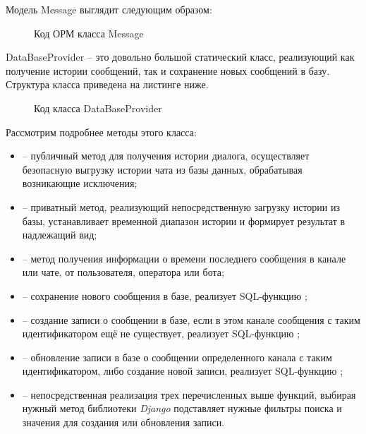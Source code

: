     \newpage
    Модель Message выглядит следующим образом:

    \begin{figure}[!h]
        \centering
        
        \caption{Код ОРМ класса Message}
        \label{fig:message_model}
    \end{figure}

    DataBaseProvider -- это довольно большой статический класс, реализующий как получение истории сообщений,
    так и сохранение новых сообщений в базу.
    Структура класса приведена на листинге ниже.

    \begin{figure}[!h]
        \centering
        
        \caption{Код класса DataBaseProvider}
        \label{fig:DataBaseProvider}
    \end{figure}

    Рассмотрим подробнее методы этого класса:
    \begin{itemize}
        \item {} -- публичный метод для получения истории диалога, осуществляет
        безопасную выгрузку истории чата из базы данных, обрабатывая возникающие исключения;
        \item {} -- приватный метод, реализующий непосредственную загрузку истории из базы,
        устанавливает временной диапазон истории и формирует результат в надлежащий вид;
        \item {} -- метод получения информации о времени последнего сообщения
        в канале или чате, от пользователя, оператора или бота;
        \item {} -- сохранение нового сообщения в базе, реализует SQL-функцию ;
        \item {} -- создание записи о сообщении в базе, если в этом канале сообщения с таким
        идентификатором ещё не существует, реализует SQL-функцию ;
        \item {} -- обновление записи в базе о сообщении определенного канала с таким
        идентификатором, либо создание новой записи, реализует SQL-функцию ;
        \item {} -- непосредственная реализация трех перечисленных выше функций,
        выбирая нужный метод библиотеки \textit{Django} подставляет нужные фильтры поиска и значения для создания
        или обновления записи.
    \end{itemize}

